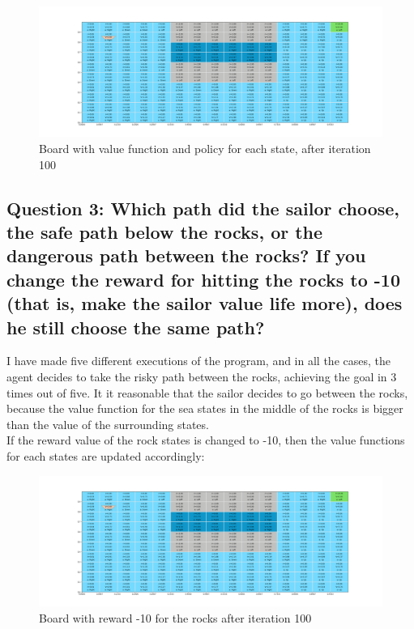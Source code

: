 \documentclass[12pt]{article}
\begin{document}
\begin{figure}[H]
    \centering
    \includegraphics[scale=0.25]{exercise-2/report/img/final-board-with-policy.png}
    \caption{Board with value function and policy for each state, after iteration 100}
    \label{fig:pol-final-board}
\end{figure}

\subsection{Question 3: Which path did the sailor choose, the safe path below the rocks, or the dangerous path between the rocks? If you change the reward for hitting the rocks to -10 (that is, make the sailor value life more), does he still choose the same path?}

I have made five different executions of the program, and in all the cases, the agent decides to take the risky path between the rocks, achieving the goal in 3 times out of five. It it reasonable that the sailor decides to go between the rocks, because the value function for the sea states in the middle of the rocks is bigger than the value of the surrounding states. \\

If the reward value of the rock states is changed to -10, then the value functions for each states are updated accordingly:

\begin{figure}[H]
    \centering
    \includegraphics[scale=0.25]{exercise-2/report/img/final-board-with-policy-2.png}
    \caption{Board with reward -10 for the rocks after iteration 100}
    \label{fig:pol-final-board}
\end{figure}
\end{document}
